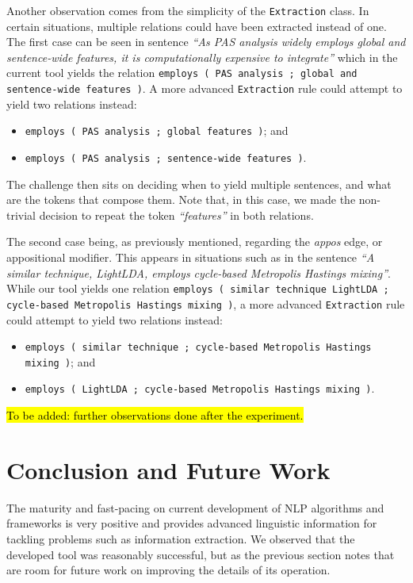 \documentclass[11pt,a4paper,openright]{memoir}
\begin{document}
Another observation comes from the simplicity of the \texttt{Extraction} class. In certain situations, multiple relations could have been extracted instead of one. The first case can be seen in sentence \emph{\enquote{As PAS analysis widely employs global and sentence-wide features, it is computationally expensive to integrate}} which in the current tool yields the relation \texttt{employs	( PAS analysis ; global and sentence-wide features )}. A more advanced \texttt{Extraction} rule could attempt to yield two relations instead:
\begin{itemize}
	\item \texttt{employs	( PAS analysis ; global features )}; and
	\item \texttt{employs	( PAS analysis ; sentence-wide features )}.
\end{itemize}

The challenge then sits on deciding when to yield multiple sentences, and what are the tokens that compose them. Note that, in this case, we made the non-trivial decision to repeat the token \emph{\enquote{features}} in both relations.

The second case being, as previously mentioned, regarding the \emph{appos} edge, or appositional modifier. This appears in situations such as in the sentence \emph{\enquote{A similar technique, LightLDA, employs cycle-based Metropolis Hastings mixing}}. While our tool yields one relation \texttt{employs	( similar technique LightLDA ; cycle-based Metropolis Hastings mixing )}, a more advanced \texttt{Extraction} rule could attempt to yield two relations instead:
\begin{itemize}
	\item \texttt{employs	( similar technique ; cycle-based Metropolis Hastings mixing )}; and
	\item \texttt{employs	( LightLDA ; cycle-based Metropolis Hastings mixing )}.
\end{itemize}

\hl{To be added: further observations done after the experiment.}

%
%
%
%


\chapter{Conclusion and Future Work}
\label{chapter:conclusion}

The maturity and fast-pacing on current development of NLP algorithms and frameworks is very positive and provides advanced linguistic information for tackling problems such as information extraction. We observed that the developed tool was reasonably successful, but as the previous section notes that are room for future work on improving the details of its operation.
\end{document}
